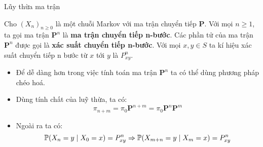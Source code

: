 \begin{frame}{Lũy thừa ma trận}
    \begin{mydef*}{}
    Cho $(X_n)_{n \geq 0}$ là một chuỗi Markov với ma trận chuyển tiếp $\mathbf{P}$. Với mọi $n \geq 1$, ta gọi ma trận $\mathbf{P}^n$ là \textbf{ma trận chuyển tiếp n-bước}. Các phần tử của ma trận $\mathbf{P}^n$ được gọi là \textbf{xác suất chuyển tiếp n-bước}. Với mọi $x, y \in S$  ta kí hiệu xác suất chuyển tiếp n bước từ $x$ tới $y$ là $P^n_{xy}$.
\end{mydef*}

\begin{itemize}
    \item[\bullet] Để dễ dàng hơn trong việc tính toán ma trận $\mathbf{P}^n$ ta có thể dùng phương pháp chéo hoá.
    \item[\bullet] Dùng tính chất của luỹ thừa, ta có:
    $$
    \pi_{n + m} = \pi_0 \mathbf{P}^{n + m} = \pi_0 \mathbf{P}^n \mathbf{P}^m
    $$

    \item[\bullet] Ngoài ra ta có:
    $$
    \P(X_n = y \mid X_0 = x) = P^n_{xy} \implies \P(X_{m + n} = y \mid X_{m} = x) = P^n_{xy}
    $$
\end{itemize}
\end{frame}
